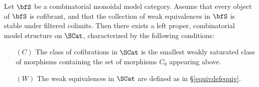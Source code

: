 \begin{proposition}\label{enrichcatper}
Let $\bfS$ be a combinatorial monoidal model category. Assume that every object of
$\bfS$ is cofibrant, and that the collection of weak equivalences in $\bfS$ is stable
under filtered colimits. Then
there exists a left proper, combinatorial model structure on $\SCat$, characterized by the following
conditions:
\begin{itemize}
\item[$(C)$] The class of cofibrations in $\SCat$ is the smallest weakly saturated class of morphisms
containing the set of morphisms $C_0$ appearing above.
\item[$(W)$] The weak equivalences in $\SCat$ are defined as in \S \ref{equivdefequiv}.
\end{itemize}
\end{proposition}

